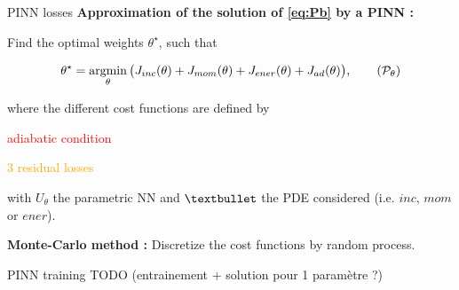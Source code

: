 \begin{frame}{PINN losses}
    \textbf{Approximation of the solution of \eqref{eq:Pb} by a PINN :} 
    
    Find the optimal weights $\theta^\star$, such that
	
    \vspace{-5pt}
    \begin{equation}
		\label{eq:opt_pb}
		\theta^\star = \argmin_{\theta}	\big( J_{inc}(\theta) + J_{mom}(\theta) + J_{ener}(\theta) + J_{ad}(\theta) \big),
		\tag{$\mathcal{P}_\theta$}
	\end{equation}

	where the different cost functions are defined by
	\vspace{5pt}

	\begin{minipage}{0.24\linewidth}
		\centering
		\textcolor{red}{adiabatic condition}
        
		\vspace{12pt}
		\textcolor{orange}{$3$ residual losses}
	\end{minipage}
	\begin{minipage}{0.68\linewidth}
		\centering
        
        \vspace{3pt}
	\end{minipage}
    
    \vspace{5pt}
    with $U_\theta$ the parametric NN and $\textbullet$ the PDE considered (i.e. $inc$, $mom$ or $ener$).

	
	\vspace{5pt}

	\vspace{5pt}
	\textbf{Monte-Carlo method :} Discretize the cost functions by random process.
	\vspace{15pt}
\end{frame}

\begin{frame}{PINN training}
    TODO (entrainement + solution pour 1 paramètre ?)
\end{frame}